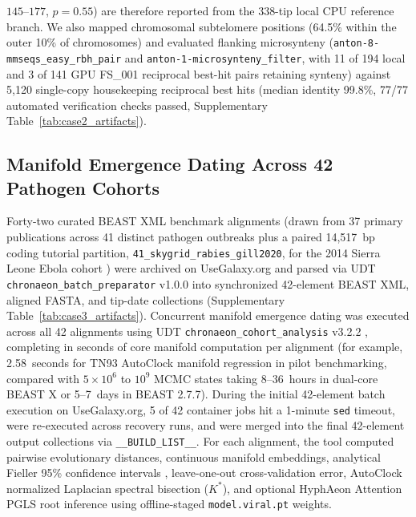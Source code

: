 \documentclass[11pt,letterpaper]{article}
\begin{document}
$145\text{--}177$, $p = 0.55$) are therefore reported from the 338-tip local CPU reference branch. We also mapped chromosomal subtelomere positions (64.5\% within the outer 10\% of chromosomes) and evaluated flanking microsynteny (\texttt{anton-8-mmseqs\_easy\_rbh\_pair} and \texttt{anton-1-microsynteny\_filter}, with 11 of 194 local and 3 of 141 GPU FS\_001 reciprocal best-hit pairs retaining synteny) against 5,120 single-copy housekeeping reciprocal best hits (median identity 99.8\%, 77/77 automated verification checks passed, Supplementary Table~\ref{tab:case2_artifacts}).

\subsection*{Manifold Emergence Dating Across 42 Pathogen Cohorts}
Forty-two curated BEAST XML benchmark alignments (drawn from 37 primary publications across 41 distinct pathogen outbreaks plus a paired 14,517~bp coding tutorial partition, \texttt{41\_skygrid\_rabies\_gill2020}, for the 2014 Sierra Leone Ebola cohort \cite{hill2019skygrid, gill2020skygrid}) were archived on UseGalaxy.org and parsed via UDT \texttt{chronaeon\_batch\_preparator} v1.0.0 into synchronized 42-element BEAST XML, aligned FASTA, and tip-date collections (Supplementary Table~\ref{tab:case3_artifacts}). Concurrent manifold emergence dating was executed across all 42 alignments using UDT \texttt{chronaeon\_cohort\_analysis} v3.2.2 \cite{pond2026hyphaeon}, completing in seconds of core manifold computation per alignment (for example, 2.58~seconds for TN93 AutoClock manifold regression in pilot benchmarking, compared with $5 \times 10^6$ to $10^9$ MCMC states taking 8--36~hours in dual-core BEAST X or 5--7~days in BEAST 2.7.7). During the initial 42-element batch execution on UseGalaxy.org, 5 of 42 container jobs hit a 1-minute \texttt{sed} timeout, were re-executed across recovery runs, and were merged into the final 42-element output collections via \texttt{\_\_BUILD\_LIST\_\_}. For each alignment, the tool computed pairwise evolutionary distances, continuous manifold embeddings, analytical Fieller 95\% confidence intervals \cite{fieller1954some}, leave-one-out cross-validation error, AutoClock normalized Laplacian spectral bisection ($K^*$), and optional HyphAeon Attention PGLS root inference using offline-staged \texttt{model.viral.pt} weights.
\end{document}
